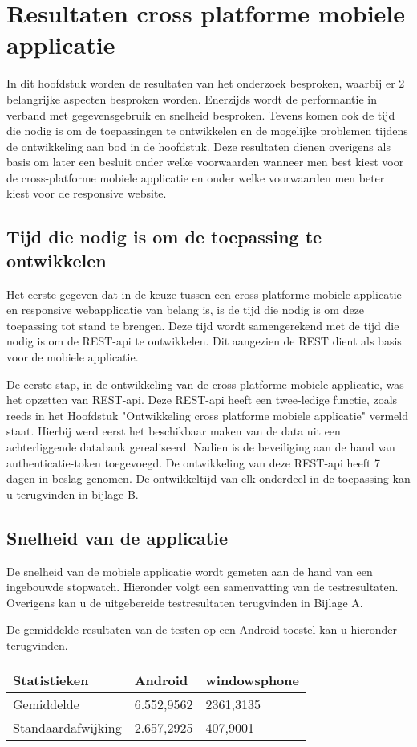 \chapter{Resultaten cross platforme mobiele applicatie}
\label{ch:resultatencrossplatformapp}
In dit hoofdstuk worden de resultaten van het onderzoek besproken, waarbij er 2 belangrijke
aspecten besproken worden.
Enerzijds wordt de performantie in verband met gegevensgebruik en  snelheid besproken.
Tevens komen ook de tijd die nodig is om de toepassingen te ontwikkelen en de mogelijke
problemen tijdens de ontwikkeling aan bod in de hoofdstuk.
Deze resultaten dienen overigens als basis om later een besluit onder welke
voorwaarden wanneer men best kiest voor de
cross-platforme mobiele applicatie en onder welke voorwaarden men beter kiest voor de responsive website.

\section{Tijd die nodig is om de toepassing te ontwikkelen}
Het eerste gegeven dat in de keuze tussen een cross platforme mobiele
applicatie en responsive webapplicatie van belang is,
is de tijd die nodig is om deze toepassing tot stand te brengen.
Deze tijd wordt samengerekend met de tijd die nodig is om de
REST-api te ontwikkelen. Dit aangezien de REST dient als basis voor de mobiele applicatie.

De eerste stap, in de ontwikkeling van de cross platforme mobiele applicatie, was het opzetten van REST-api.
Deze REST-api heeft een twee-ledige functie, zoals reeds in het Hoofdstuk "Ontwikkeling cross platforme mobiele applicatie" vermeld staat.
Hierbij werd eerst het beschikbaar maken van de data uit een achterliggende databank gerealiseerd. Nadien is de beveiliging aan de hand
van authenticatie-token toegevoegd. De ontwikkeling van deze REST-api heeft 7 dagen in beslag genomen. De ontwikkeltijd van elk onderdeel
in de toepassing kan u terugvinden in bijlage B.

\section{Snelheid van de applicatie}
De snelheid van de mobiele applicatie wordt gemeten aan de hand van een ingebouwde stopwatch.
Hieronder volgt een samenvatting van de testresultaten. Overigens kan u de uitgebereide testresultaten terugvinden in Bijlage A.

De gemiddelde resultaten van de testen op een Android-toestel kan u hieronder terugvinden.
\begin{center}
\begin{tabular}{| l | l | l | }
  \hline
  Statistieken & Android & windowsphone \\ \hline
  Gemiddelde & 6.552,9562 & 2361,3135 \\ \hline
  Standaardafwijking & 2.657,2925 & 407,9001 \\
  \hline
\end{tabular}
\end{center}

